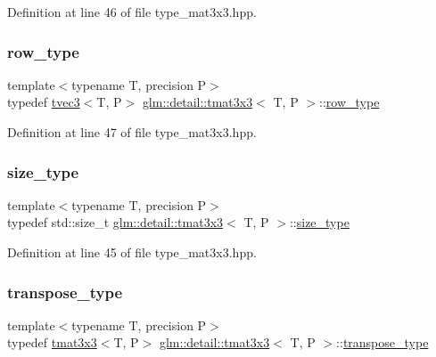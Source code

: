 Definition at line 46 of file type\+\_\+mat3x3.\+hpp.

\mbox{\label{structglm_1_1detail_1_1tmat3x3_ad963d0adf30cc0c48a2c4166d8fa93b9}} 
\subsubsection{\texorpdfstring{row\+\_\+type}{row\_type}}
{\footnotesize\ttfamily template$<$typename T, precision P$>$ \\
typedef \hyperlink{structglm_1_1detail_1_1tvec3}{tvec3}$<$T, P$>$ \hyperlink{structglm_1_1detail_1_1tmat3x3}{glm\+::detail\+::tmat3x3}$<$ T, P $>$\+::\hyperlink{structglm_1_1detail_1_1tmat3x3_ad963d0adf30cc0c48a2c4166d8fa93b9}{row\+\_\+type}}



Definition at line 47 of file type\+\_\+mat3x3.\+hpp.

\mbox{\label{structglm_1_1detail_1_1tmat3x3_ac2c45ac2aeb10c76e17a54cae3652819}} 
\subsubsection{\texorpdfstring{size\+\_\+type}{size\_type}}
{\footnotesize\ttfamily template$<$typename T, precision P$>$ \\
typedef std\+::size\+\_\+t \hyperlink{structglm_1_1detail_1_1tmat3x3}{glm\+::detail\+::tmat3x3}$<$ T, P $>$\+::\hyperlink{structglm_1_1detail_1_1tmat3x3_ac2c45ac2aeb10c76e17a54cae3652819}{size\+\_\+type}}



Definition at line 45 of file type\+\_\+mat3x3.\+hpp.

\mbox{\label{structglm_1_1detail_1_1tmat3x3_a3ecde8b3a849d43a5aefed5f542c041f}} 
\subsubsection{\texorpdfstring{transpose\+\_\+type}{transpose\_type}}
{\footnotesize\ttfamily template$<$typename T, precision P$>$ \\
typedef \hyperlink{structglm_1_1detail_1_1tmat3x3}{tmat3x3}$<$T, P$>$ \hyperlink{structglm_1_1detail_1_1tmat3x3}{glm\+::detail\+::tmat3x3}$<$ T, P $>$\+::\hyperlink{structglm_1_1detail_1_1tmat3x3_a3ecde8b3a849d43a5aefed5f542c041f}{transpose\+\_\+type}}



